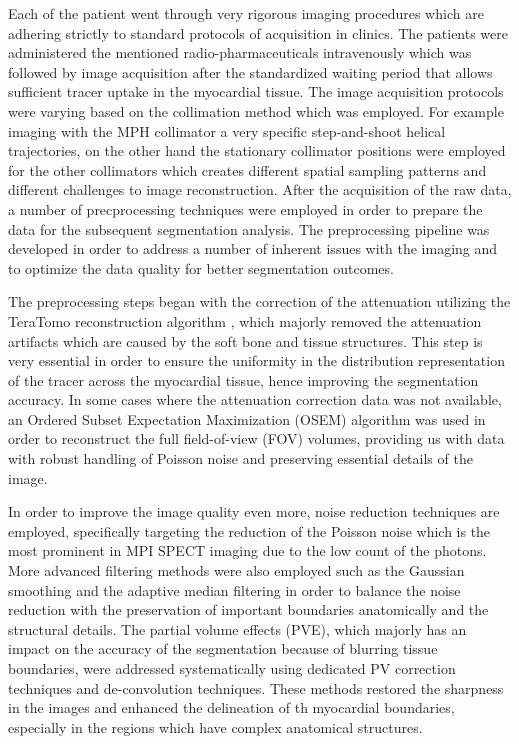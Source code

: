 Each of the patient went through very rigorous imaging procedures which are adhering strictly to standard protocols of acquisition in clinics. The patients were administered the mentioned radio-pharmaceuticals intravenously which was followed by image acquisition after the standardized waiting period that allows sufficient tracer uptake in the myocardial tissue. The image acquisition protocols were varying based on the collimation method which was employed. For example imaging with the MPH collimator a very specific step-and-shoot helical trajectories, on the other hand the stationary collimator positions were employed for the other collimators which creates different spatial sampling patterns and different challenges to image reconstruction. After the acquisition of the raw data, a number of precprocessing techniques were employed in order to prepare the data for the subsequent segmentation analysis. The preprocessing pipeline was developed in order to address a number of inherent issues with the imaging and to optimize the data quality for better segmentation outcomes.

The preprocessing steps began with the correction of the attenuation utilizing the TeraTomo reconstruction algorithm \cite{Nagy2013}, which majorly removed the attenuation artifacts which are caused by the soft bone and tissue structures. This step is very essential in order to ensure the uniformity in the distribution representation of the tracer across the myocardial tissue, hence improving the segmentation accuracy. In some cases where the attenuation correction data was not available, an Ordered Subset Expectation Maximization (OSEM) algorithm \cite{Hudson1994} was used in order to reconstruct the full field-of-view (FOV) volumes, providing us with data with robust handling of Poisson noise and preserving essential details of the image. 

In order to improve the image quality even more, noise reduction techniques are employed, specifically targeting the reduction of the Poisson noise which is the most prominent in MPI SPECT imaging due to the low count of the photons. More advanced filtering methods were also employed such as the Gaussian smoothing and the adaptive median filtering in order to balance the noise reduction with the preservation of important boundaries anatomically and the structural details. The partial volume effects (PVE), which majorly has an impact on the accuracy of the segmentation because of blurring tissue boundaries, were addressed systematically using dedicated PV correction techniques and de-convolution techniques. These methods restored the sharpness in the images and enhanced the delineation of th myocardial boundaries, especially in the regions which have complex anatomical structures.

